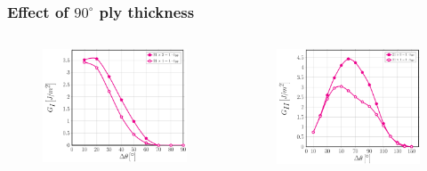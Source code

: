 \documentclass[first,firstsupp,lastsupp,last,hyperref,table]{ETHclass}
\begin{document}
\begin{frame}
\frametitle{\vspace{0.2cm}\small Effect of $90^{\circ}$ ply thickness}
\vspace{-.75cm}
\centering
\begin{columns}[c]
\centering
\begin{column}{0.5\textwidth}
\centering
\begin{figure}
\centering
\includegraphics[width=\columnwidth]{nxk-1-vf60-GI-extremethin.pdf}
\end{figure}
\end{column}
\begin{column}{0.5\textwidth}
\centering
\begin{figure}
\centering
\includegraphics[width=\columnwidth]{nxk-1-vf60-GII-extremethin.pdf}

\end{figure}
\end{column}
\end{columns}
\end{frame}
\end{document}
